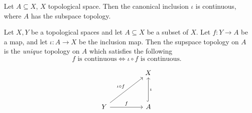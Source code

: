 \begin{remark}
  Let \( A \subseteq X \), \( X \) topological space.
  Then the canonical inclusion \( \iota \) is continuous,
  where \( A \) has the subspace topology.
\end{remark}

\begin{theorem}
   Let \( X, Y \) be a topological spaces and let \( A \subseteq X \) be a subset of \( X \). Let \( f: Y \to A \) be a map, and let
   \( \iota: A \to X  \) be the inclusion map.
   Then the supspace topology on \( A \) is the \textit{unique} topology
   on \( A \) which satisfies the following
   \begin{equation} \label{eq:sub}
     f \text{ is continuous} \iff \iota \circ f \text{ is continuous.}
   \end{equation}
\end{theorem}
\[\begin{tikzcd}
	&& X \\
	\\
	Y && A
	\arrow["{\iota \circ f}", from=3-1, to=1-3]
	\arrow["f", from=3-1, to=3-3]
	\arrow["\iota"', hook, from=3-3, to=1-3]
\end{tikzcd}\]

